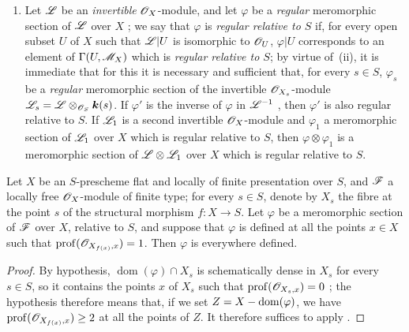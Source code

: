 \begin{remarks}[20.6.5]
\begin{enumerate}[label=(\roman*)]
  \item Let $\mathscr{L}$ be an \emph{invertible} $\mathscr{O}_X$-module, and let $\varphi$ be a \emph{regular} meromorphic section of $\mathscr{L}$ over $X$ ; we say that $\varphi$ is \emph{regular relative to $S$} if, for every open subset $U$ of $X$ such that $\mathscr{L}|U$ is isomorphic to $\mathscr{O}_U$, $\varphi|U$ corresponds to an element of $\Gamma(U,\mathscr{M}_X)$ which is \emph{regular relative to $S$}; by virtue of~(ii), it is immediate that for this it is necessary and sufficient that, for every $s\in S$, $\varphi_s$ be a \emph{regular} meromorphic section  of the invertible $\mathscr{O}_{X_s}$-module $\mathscr{L}_s=\mathscr{L}\otimes_{\mathscr{O}_S}\boldsymbol{k}(s)$.
  If $\varphi'$ is the inverse of $\varphi$ in $\mathscr{L}^{-1}$ , then $\varphi'$ is also regular relative to $S$.
  If $\mathscr{L}_1$ is a second invertible $\mathscr{O}_X$-module and $\varphi_1$ a meromorphic section of $\mathscr{L}_1$ over $X$ which is regular relative to $S$, then $\varphi\otimes\varphi_1$ is a meromorphic section of $\mathscr{L}\otimes\mathscr{L}_1$ over $X$ which is regular relative to $S$.
\end{enumerate}
\end{remarks}

\begin{proposition}[20.6.6]
\label{IV.20.6.6}
Let $X$ be an $S$-prescheme flat and locally of finite presentation over $S$, and $\mathscr{F}$ a locally free $\mathscr{O}_X$-module of finite type; for every $s\in S$, denote by $X_s$ the fibre at the point $s$ of the structural morphism $f:X\to S$.
Let $\varphi$ be a meromorphic section of $\mathscr{F}$ over $X$, relative to $S$, and suppose that $\varphi$ is defined at all the points $x\in X$ such that $\operatorname{prof}(\mathscr{O}_{X_{f(x)},x})=1$.
Then $\varphi$ is everywhere defined.
\end{proposition}

\begin{proof}
By hypothesis, $\operatorname{dom}(\varphi)\cap X_s$ is schematically dense in $X_s$ for every $s\in S$, so it contains the points $x$ of $X_s$ such that $\operatorname{prof}(\mathscr{O}_{X_s,x})=0$ ; the hypothesis therefore means that, if we set $Z=X-\operatorname{dom}(\varphi)$, we have $\operatorname{prof}(\mathscr{O}_{X_{f(x)},x})\geq2$ at all the points of $Z$.
It therefore suffices to apply .
\end{proof}

